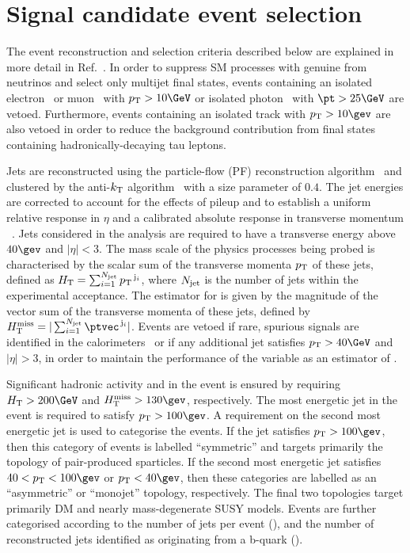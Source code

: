 \section{Signal candidate event selection}
\label{sec:event_selection}

The event reconstruction and selection criteria described below are
explained in more detail in Ref.~\cite{RA1Paper2012}. In order to
suppress SM processes with genuine \ETmiss from neutrinos and select
only multijet final states, events containing an isolated
electron~\cite{PAS-EGM-10-004} or muon~\cite{PAS-MUO-10-004} with $\Pt
> 10\GeV$ or isolated photon~\cite{PAS-EGM-10-006} with $\pt > 25\GeV$
are vetoed. Furthermore, events containing an isolated track with $\Pt
> 10\gev$ are also vetoed in order to reduce the background
contribution from final states containing hadronically-decaying tau
leptons.

Jets are reconstructed using the particle-flow (PF) reconstruction
algorithm~\cite{CMS-PAS-PFT-09-001, CMS-PAS-PFT-10-001} and clustered
by the anti-$k_{\rm T}$ algorithm~\cite{antikt} with a size parameter
of $0.4$. The jet energies are corrected to account for the effects of
pileup and to establish a uniform relative response in $\eta$ and a
calibrated absolute response in transverse momentum
\pt~\cite{2011arXiv1107.4277C}. Jets considered in the analysis are
required to have a transverse energy above $40\gev$ and $|\eta| <
3$. The mass scale of the physics processes being probed is
characterised by the scalar sum of the transverse momenta $\Pt$ of
these jets, defined as $\scalht = \sum_{i=1}^{N_{\rm jet}}
\Pt^{\,\mathrm{j}_i}$, where $N_{\rm jet}$ is the number of jets
within the experimental acceptance. The estimator for \ETmiss is given
by the magnitude of the vector sum of the transverse momenta of these
jets, defined by $\mht = |\sum_{i=1}^{N_\text{jet}}
\ptvec^{\,\mathrm{j}_i}|$. Events are vetoed if rare, spurious signals
are identified in the calorimeters~\cite{1748-0221-5-03-T03014,
  CMS-NOTE-2010-012} or if any additional jet satisfies $\Pt > 40\GeV$
and $|\eta| > 3$, in order to maintain the performance of the variable
\mht as an estimator of \ETmiss.

Significant hadronic activity and \met in the event is ensured by
requiring $\scalht > 200\GeV$ and $\mht > 130\gev$, respectively. The
most energetic jet in the event is required to satisfy $\Pt >
100\gev$. A requirement on the second most energetic jet is used to
categorise the events. If the jet satisfies $\Pt > 100\gev$, then this
category of events is labelled ``symmetric'' and targets primarily the
topology of pair-produced sparticles. If the second most energetic jet
satisfies $40 < \Pt < 100\gev$ or $\Pt < 40\gev$, then these
categories are labelled as an ``asymmetric'' or ``monojet'' topology,
respectively. The final two topologies target primarily DM and nearly
mass-degenerate SUSY models. Events are further categorised according
to the number of jets per event (\njet), and the number of
reconstructed jets identified as originating from a b-quark (\nb).


